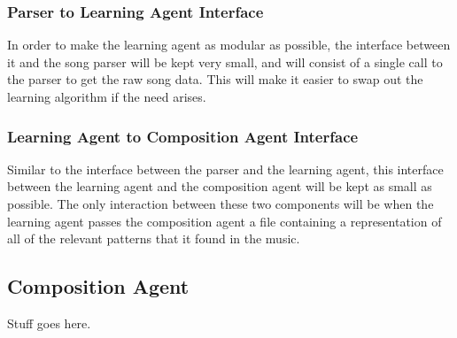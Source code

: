 \documentclass{article}
\begin{document}
\subsubsection{Parser to Learning Agent Interface}
In order to make the learning agent as modular as possible, the interface between it and the song parser will be kept very small, and will consist of a single call to the parser to get the raw song data. This will make it easier to swap out the learning algorithm if the need arises.

\subsubsection{Learning Agent to Composition Agent Interface}
Similar to the interface between the parser and the learning agent, this interface between the learning agent and the composition agent will be kept as small as possible. The only interaction between these two components will be when the learning agent passes the composition agent a file containing a representation of all of the relevant patterns that it found in the music.

\subsection{Composition Agent}
Stuff goes here.

\nocite{*}





\end{document}
